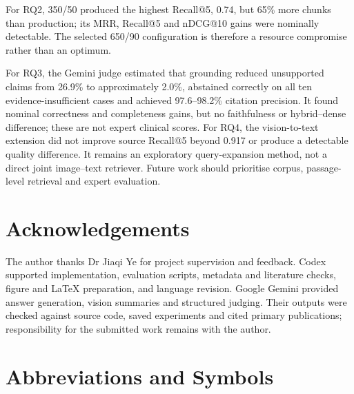 \documentclass[11pt,a4paper]{article}
\begin{document}
For RQ2, 350/50 produced the highest Recall@5, 0.74, but 65\% more chunks than production; its MRR, Recall@5 and nDCG@10 gains were nominally detectable. The selected 650/90 configuration is therefore a resource compromise rather than an optimum.

For RQ3, the Gemini judge estimated that grounding reduced unsupported claims from 26.9\% to approximately 2.0\%, abstained correctly on all ten evidence-insufficient cases and achieved 97.6--98.2\% citation precision. It found nominal correctness and completeness gains, but no faithfulness or hybrid--dense difference; these are not expert clinical scores. For RQ4, the vision-to-text extension did not improve source Recall@5 beyond 0.917 or produce a detectable quality difference. It remains an exploratory query-expansion method, not a direct joint image--text retriever. Future work should prioritise corpus, passage-level retrieval and expert evaluation.

\FloatBarrier
\section*{Acknowledgements}

The author thanks Dr Jiaqi Ye for project supervision and feedback. Codex supported implementation, evaluation scripts, metadata and literature checks, figure and LaTeX preparation, and language revision. Google Gemini provided answer generation, vision summaries and structured judging. Their outputs were checked against source code, saved experiments and cited primary publications; responsibility for the submitted work remains with the author.

\FloatBarrier
\printbibliography[title={References}]

\clearpage
\appendix
\section{Abbreviations and Symbols}
\label{sec:abbreviations}
\end{document}
